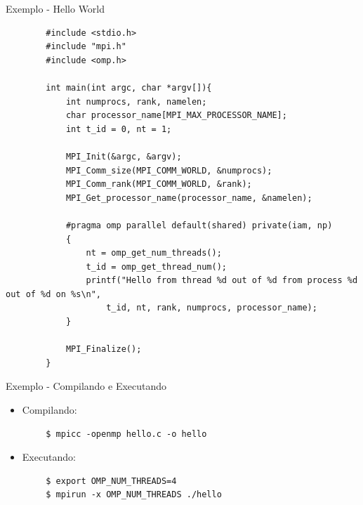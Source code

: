 \begin{frame}[fragile]{Exemplo - Hello World}
	\begin{verbatim}
		#include <stdio.h>
		#include "mpi.h"
		#include <omp.h>
		
		int main(int argc, char *argv[]){
			int numprocs, rank, namelen;
			char processor_name[MPI_MAX_PROCESSOR_NAME];
			int t_id = 0, nt = 1;
			
			MPI_Init(&argc, &argv);
			MPI_Comm_size(MPI_COMM_WORLD, &numprocs);
			MPI_Comm_rank(MPI_COMM_WORLD, &rank);
			MPI_Get_processor_name(processor_name, &namelen);
			
			#pragma omp parallel default(shared) private(iam, np)
			{
				nt = omp_get_num_threads();
				t_id = omp_get_thread_num();
				printf("Hello from thread %d out of %d from process %d out of %d on %s\n",
					t_id, nt, rank, numprocs, processor_name);
			}
			
			MPI_Finalize();
		}
	\end{verbatim}
\end{frame}

\begin{frame}[fragile]{Exemplo - Compilando e Executando}
	\begin{itemize}
		\item Compilando:
	\end{itemize}
	\begin{verbatim}
		$ mpicc -openmp hello.c -o hello
	\end{verbatim}
	\begin{itemize}
		\item Executando:
	\end{itemize}
	\begin{verbatim}
		$ export OMP_NUM_THREADS=4
		$ mpirun -x OMP_NUM_THREADS ./hello
	\end{verbatim}
\end{frame}

